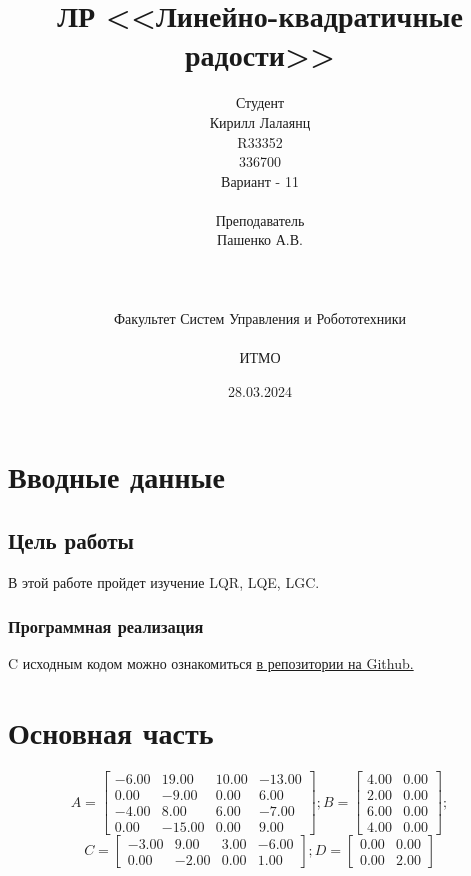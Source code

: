 \documentclass[16pt]{article}
\title{ЛР \textnumero 10 <<Линейно-квадратичные радости>>}
\author{
Студент \\
Кирилл Лалаянц\\
R33352\\
336700\\
Вариант - 11\\
\\
Преподаватель\\
Пашенко А.В. \\
\\
\\
\\
Факультет Систем Управления и Робототехники\\
\\
ИТМО\\
}
\date{28.03.2024}
\begin{document}
\maketitle
\newpage
\tableofcontents
\thispagestyle{empty}

\newpage
\setcounter{page}{1}
\section{Вводные данные}
\subsection{Цель работы}
В этой работе пройдет изучение LQR, LQE, LGC.

\subsubsection{Программная реализация}
C исходным кодом можно ознакомиться \href{https://github.com/lalayants/control-theory-itmo-2023-2024}{в репозитории на Github.}


\newpage
\section{Основная часть}
\[
   A = \begin{bmatrix}
   -6.00 &  19.00 &  10.00 & -13.00\\
    0.00 & -9.00 &  0.00 &  6.00\\
   -4.00 &  8.00 &  6.00 & -7.00\\
    0.00 & -15.00 &  0.00 &  9.00
  \end{bmatrix};
  B = \begin{bmatrix}
   4.00 &  0.00\\
   2.00 &  0.00\\
   6.00 &  0.00\\
   4.00 &  0.00
 \end{bmatrix};
\]
\[
 C = \begin{bmatrix}
   -3.00 &  9.00 &  3.00 & -6.00\\
    0.00 & -2.00 &  0.00 &  1.00
  \end{bmatrix};
  D = \begin{bmatrix}
   0.00 &  0.00\\
   0.00 &  2.00
 \end{bmatrix}
\]

\FloatBarrier


\FloatBarrier


\FloatBarrier
\end{document}
